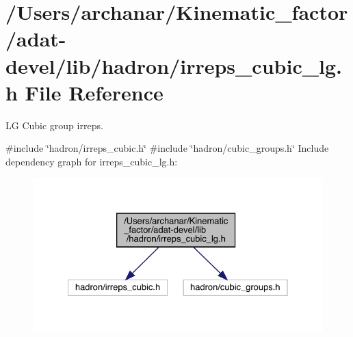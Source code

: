 \hypertarget{adat-devel_2lib_2hadron_2irreps__cubic__lg_8h}{}\section{/\+Users/archanar/\+Kinematic\+\_\+factor/adat-\/devel/lib/hadron/irreps\+\_\+cubic\+\_\+lg.h File Reference}
\label{adat-devel_2lib_2hadron_2irreps__cubic__lg_8h}


LG Cubic group irreps.  


{\ttfamily \#include \char`\"{}hadron/irreps\+\_\+cubic.\+h\char`\"{}}\newline
{\ttfamily \#include \char`\"{}hadron/cubic\+\_\+groups.\+h\char`\"{}}\newline
Include dependency graph for irreps\+\_\+cubic\+\_\+lg.\+h\+:
\nopagebreak
\begin{figure}[H]
\begin{center}
\leavevmode
\includegraphics[width=328pt]{dd/d87/adat-devel_2lib_2hadron_2irreps__cubic__lg_8h__incl}
\end{center}
\end{figure}
